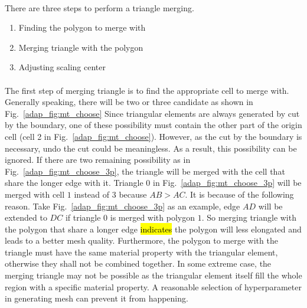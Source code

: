 \paragraph{}
There are three steps to perform a triangle merging.
\begin{enumerate}
    \item Finding the polygon to merge with
    \item Merging triangle with the polygon
    \item Adjusting scaling center
\end{enumerate}

\paragraph{}
The first step of merging triangle is to find the appropriate cell to merge with.
Generally speaking, there will be two or three candidate as shown in Fig.~\ref{adap_fig:mt_choose}
Since triangular elements are always generated by cut by the boundary, one of these possibility must contain the other part of the origin cell (cell 2 in Fig.~\ref{adap_fig:mt_choose}).
However, as the cut by the boundary is necessary, undo the cut could be meaningless.
As a result, this possibility can be ignored.
If there are two remaining possibility as in Fig.~\ref{adap_fig:mt_choose_3p}, the triangle will be merged with the cell that share the longer edge with it.
Triangle $0$ in Fig.~\ref{adap_fig:mt_choose_3p} will be merged with cell $1$ instead of $3$ because $AB > AC$.
It is because of the following reason.
Take Fig.~\ref{adap_fig:mt_choose_3p} as an example, edge $AD$ will be extended to $DC$ if triangle $0$ is merged with polygon $1$.
So merging triangle with the polygon that share a longer edge \hl{indicates} the polygon will less elongated and leads to a better mesh quality.
Furthermore, the polygon to merge with the triangle must have the same material property with the triangular element, otherwise they shall not be combined together.
In some extreme case, the merging triangle may not be possible as the triangular element itself fill the whole region with a specific material property.
A reasonable selection of hyperparameter in generating mesh can prevent it from happening.

